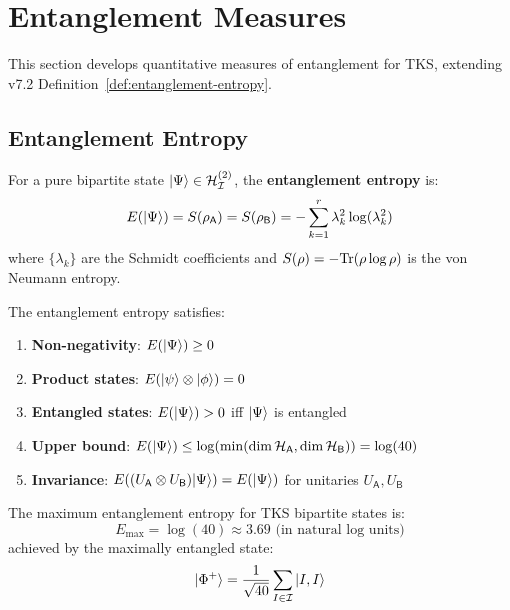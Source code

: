 \section{Entanglement Measures}
\label{sec:entanglement-measures}

This section develops quantitative measures of entanglement for TKS, extending v7.2 Definition~\ref{def:entanglement-entropy}.

\subsection{Entanglement Entropy}

\begin{definition}
\label{def:entanglement-entropy-v73}
For a pure bipartite state $|\Psi\rangle \in \mathcal{H}_{\mathcal{I}}^{(2)}$, the \textbf{entanglement entropy} is:
\[
E(|\Psi\rangle) = S(\rho_\mathsf{A}) = S(\rho_\mathsf{B}) = -\sum_{k=1}^{r} \lambda_k^2 \log(\lambda_k^2)
\]
where $\{\lambda_k\}$ are the Schmidt coefficients and $S(\rho) = -\mathrm{Tr}(\rho \log \rho)$ is the von Neumann entropy.
\end{definition}

\begin{proposition}
\label{prop:entanglement-entropy-props}
The entanglement entropy satisfies:
\begin{enumerate}
  \item \textbf{Non-negativity}: $E(|\Psi\rangle) \geq 0$
  \item \textbf{Product states}: $E(|\psi\rangle \otimes |\phi\rangle) = 0$
  \item \textbf{Entangled states}: $E(|\Psi\rangle) > 0$ iff $|\Psi\rangle$ is entangled
  \item \textbf{Upper bound}: $E(|\Psi\rangle) \leq \log(\min(\dim \mathcal{H}_\mathsf{A}, \dim \mathcal{H}_\mathsf{B})) = \log(40)$
  \item \textbf{Invariance}: $E((U_\mathsf{A} \otimes U_\mathsf{B})|\Psi\rangle) = E(|\Psi\rangle)$ for unitaries $U_\mathsf{A}, U_\mathsf{B}$
\end{enumerate}
\end{proposition}

\begin{theorem}
\label{thm:max-entanglement-v73}
The maximum entanglement entropy for TKS bipartite states is:
\[
E_{\max} = \log(40) \approx 3.69 \text{ (in natural log units)}
\]
achieved by the maximally entangled state:
\[
|\Phi^+\rangle = \frac{1}{\sqrt{40}} \sum_{I \in \mathcal{I}} |I, I\rangle
\]
\end{theorem}

